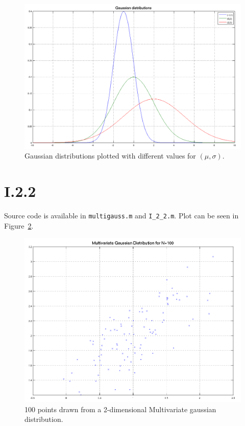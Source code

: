 \begin{figure}[h!]
	\includegraphics[width=\textwidth]{img/unigauss}
	\caption{Gaussian distributions plotted with different values for
          $(\mu, \sigma)$. \label{fig:I.2.1}}
\end{figure}

\section*{I.2.2}
Source code is available in \texttt{multigauss.m} and \texttt{I\_2\_2.m}.
Plot can be seen in Figure~\ref{fig:I.2.2}.
\begin{figure}[h!]
	\includegraphics[width=\textwidth]{img/multigauss}
	\caption{100 points drawn from a 2-dimensional Multivariate gaussian
          distribution. \label{fig:I.2.2}}
\end{figure}

